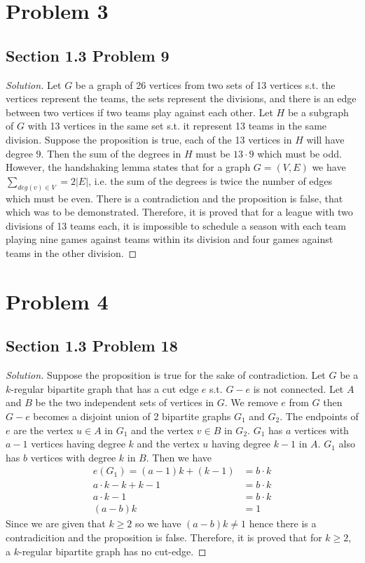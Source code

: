 \documentclass[12pt]{article}
\newenvironment*{solution}{\begin{proof}[Solution]}{\end{proof}}
\begin{document}
\section*{Problem 3}
\subsection*{Section 1.3 Problem 9}
\begin{solution}
    Let \(G\) be a graph of 26 vertices from two sets of 13 vertices s.t. the
    vertices represent the teams, the sets represent the divisions, and there
    is an edge between two vertices if two teams play against each other. Let
    \(H\) be a subgraph of \(G\) with 13 vertices in the same set s.t. it
    represent 13 teams in the same division. Suppose the proposition is true,
    each of the 13 vertices in \(H\) will have degree \(9\). Then the sum of
    the degrees in \(H\) must be \(13\cdot9\) which must be odd. However, the
    handshaking lemma states that for a graph \(G=(V,E)\) we have \(\sum_{deg
    (v)\in V}=2|E|\), i.e. the sum of the degrees is twice the number of edges
    which must be even. There is a contradiction and the proposition is false,
    that which was to be demonstrated. Therefore, it is proved that for a
    league with two divisions of 13 teams each, it is impossible to schedule a
    season with each team playing nine games against teams within its division
    and four games against teams in the other division.
\end{solution}
\section*{Problem 4}
\subsection*{Section 1.3 Problem 18}
\begin{solution}
    Suppose the proposition is true for the sake of contradiction. Let \(G\)
    be a \(k\)-regular bipartite graph that has a cut edge \(e\) s.t. \(G-e\)
    is not connected. Let \(A\) and \(B\) be the two independent sets of
    vertices in \(G\). We remove \(e\) from \(G\) then \(G-e\) becomes a
    disjoint union of 2 bipartite graphs \(G_1\) and \(G_2\). The endpoints of
    \(e\) are the vertex \(u\in A\) in \(G_1\) and the vertex \(v\in B\) in
    \(G_2\). \(G_1\) has \(a\) vertices with \(a-1\) vertices having degree
    \(k\) and the vertex \(u\) having degree \(k-1\) in \(A\). \(G_1\) also
    has \(b\) vertices with degree \(k\) in \(B\). Then we have
    \begin{align*}
        e(G_1)=(a-1)k+(k-1) &= b\cdot k \\ a\cdot k-k+k-1 &= b\cdot k \\ a
        \cdot k-1 &= b\cdot k \\ (a-b)k &= 1
    \end{align*}
    Since we are given that \(k\geq2\) so we have \((a-b)k\neq1\) hence there
    is a contradicition and the proposition is false. Therefore, it is proved
    that for \(k\geq2\), a \(k\)-regular bipartite graph has no cut-edge.
\end{solution}
\end{document}
